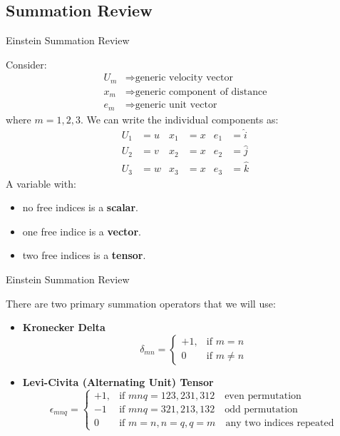 \subsection{Summation Review}
\begin{frame}{Einstein Summation Review}

Consider:
\begin{align*}
U_m &\Rightarrow \text{generic velocity vector}\\
x_m &\Rightarrow \text{generic component of distance}\\
e_m &\Rightarrow \text{generic unit vector}
\end{align*}
where $m=1,2,3$. We can write the individual components as:
\begin{align*}
U_1 &= u & x_1 &= x & e_1 &= \hat i	\\
U_2 &= v & x_2 &= x & e_2 &= \hat j\\
U_3 &= w & x_3 &= x & e_3 &= \hat k
\end{align*}
A variable with: 
\begin{itemize}
	\item no free indices is a \textbf{scalar}.
	\item one free indice is a \textbf{vector}.
	\item two free indices is a \textbf{tensor}.
\end{itemize}
\end{frame}
\begin{frame}{Einstein Summation Review}


There are two primary summation operators that we will use:
\begin{itemize}
	\item \textbf{Kronecker Delta}
	$$\delta_{mn} = 
	\begin{cases}
    +1, & \text{if } m=n\\
    0   & \text{if } m \neq n
	\end{cases}$$
	
	\item \textbf{Levi-Civita (Alternating Unit) Tensor}
	$$\epsilon_{mnq} = 
	\begin{cases}
    +1, & \text{if } mnq = 123, 231, 312\quad \text{even permutation}\\
    -1  & \text{if } mnq = 321, 213, 132\quad \text{odd permutation}\\
    0   & \text{if } m=n, n=q, q=m\quad \text{any two indices repeated}
	\end{cases}$$
\end{itemize}
\end{frame}
